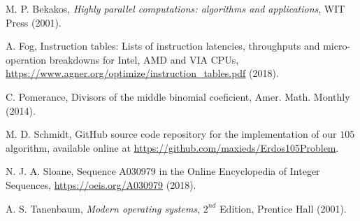 \documentclass[12pt]{article}
\begin{document}
\begin{thebibliography}{10} 

M. P. Bekakos, \emph{Highly parallel computations: algorithms and applications}, WIT Press (2001). 

A. Fog, Instruction tables: Lists of instruction latencies, throughputs and micro-operation breakdowns for Intel, AMD and VIA CPUs, \url{https://www.agner.org/optimize/instruction_tables.pdf} (2018). 

C. Pomerance, Divisors of the middle binomial coeficient, Amer. Math. Monthly (2014). 

M. D. Schmidt, GitHub source code repository for the implementation of our $105$ algorithm, 
  available online at \url{https://github.com/maxieds/Erdos105Problem}. 

N. J. A. Sloane, Sequence A030979 in the Online Encyclopedia of Integer Sequences, 
  \url{https://oeis.org/A030979} (2018). 
  
A. S. Tanenbaum, \emph{Modern operating systems}, $2^{nd}$ Edition, Prentice Hall (2001). 

\end{thebibliography} 
\end{document}
